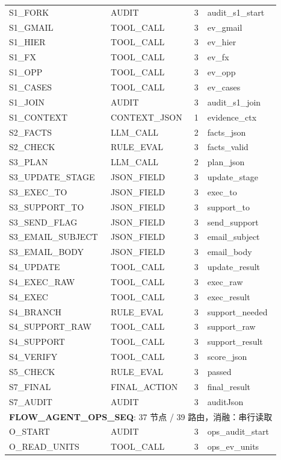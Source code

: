 {\begin{longtable}{p{5.0cm}p{3.1cm}p{1.0cm}p{5.0cm}}
S1\_FORK & AUDIT & 3 & audit\_s1\_start \\
S1\_GMAIL & TOOL\_CALL & 3 & ev\_gmail \\
S1\_HIER & TOOL\_CALL & 3 & ev\_hier \\
S1\_FX & TOOL\_CALL & 3 & ev\_fx \\
S1\_OPP & TOOL\_CALL & 3 & ev\_opp \\
S1\_CASES & TOOL\_CALL & 3 & ev\_cases \\
S1\_JOIN & AUDIT & 3 & audit\_s1\_join \\
S1\_CONTEXT & CONTEXT\_JSON & 1 & evidence\_ctx \\
S2\_FACTS & LLM\_CALL & 2 & facts\_json \\
S2\_CHECK & RULE\_EVAL & 3 & facts\_valid \\
S3\_PLAN & LLM\_CALL & 2 & plan\_json \\
S3\_UPDATE\_STAGE & JSON\_FIELD & 3 & update\_stage \\
S3\_EXEC\_TO & JSON\_FIELD & 3 & exec\_to \\
S3\_SUPPORT\_TO & JSON\_FIELD & 3 & support\_to \\
S3\_SEND\_FLAG & JSON\_FIELD & 3 & send\_support \\
S3\_EMAIL\_SUBJECT & JSON\_FIELD & 3 & email\_subject \\
S3\_EMAIL\_BODY & JSON\_FIELD & 3 & email\_body \\
S4\_UPDATE & TOOL\_CALL & 3 & update\_result \\
S4\_EXEC\_RAW & TOOL\_CALL & 3 & exec\_raw \\
S4\_EXEC & TOOL\_CALL & 3 & exec\_result \\
S4\_BRANCH & RULE\_EVAL & 3 & support\_needed \\
S4\_SUPPORT\_RAW & TOOL\_CALL & 3 & support\_raw \\
S4\_SUPPORT & TOOL\_CALL & 3 & support\_result \\
S4\_VERIFY & TOOL\_CALL & 3 & score\_json \\
S5\_CHECK & RULE\_EVAL & 3 & passed \\
S7\_FINAL & FINAL\_ACTION & 3 & final\_result \\
S7\_AUDIT & AUDIT & 3 & auditJson \\
\midrule
\multicolumn{4}{l}{\textbf{FLOW\_AGENT\_OPS\_SEQ}: 37 节点 / 39 路由，消融：串行读取} \\
\midrule
O\_START & AUDIT & 3 & ops\_audit\_start \\
O\_READ\_UNITS & TOOL\_CALL & 3 & ops\_ev\_units \\

\end{longtable}}
